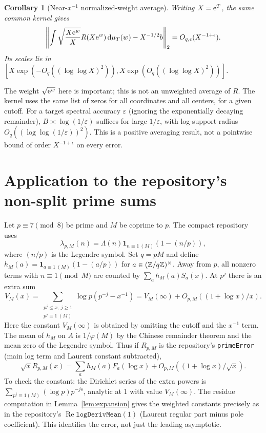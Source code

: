 \documentclass[11pt]{article}
\newtheorem{corollary}[theorem]{Corollary}
\theoremstyle{remark}\newtheorem{remark}[theorem]{Remark}
\begin{document}
\begin{corollary}[Near-$x^{-1}$ normalized-weight average]
Writing $X=\mathrm e^T$, the same common kernel gives
\[
 \left\|\int \sqrt{\frac{X\mathrm e^w}{X}}R(X\mathrm e^w)\,\mathrm d\mu_T(w)-X^{-1/2}b\right\|_2
 =O_{q,\epsilon}(X^{-1+\epsilon}).
\]
Its scales lie in $[X\exp(-O_q((\log\log X)^2)),X\exp(O_q((\log\log X)^2))]$.
\end{corollary}
The weight $\sqrt{\mathrm e^w}$ here is important; this is not an unweighted average of $R$. The kernel uses the same list of zeros for all coordinates and all centers, for a given cutoff. For a target spectral accuracy $\varepsilon$ (ignoring the exponentially decaying remainder), $B\asymp\log(1/\varepsilon)$ suffices for large $1/\varepsilon$, with log-support radius $O_q((\log\log(1/\varepsilon))^2)$. This is a positive averaging result, not a pointwise bound of order $X^{-1+\epsilon}$ on every error.

\section{Application to the repository's non-split prime sums}
Let $p\equiv7\pmod8$ be prime and $M$ be coprime to $p$. The compact repository uses
\[
 \lambda_{p,M}(n)=\Lambda(n)\mathbf1_{n\equiv1\ (M)}(1-(n/p)),
\]
where $(n/p)$ is the Legendre symbol. Set $q=pM$ and define $h_M(a)=\mathbf1_{a\equiv1\ (M)}(1-(a/p))$ for $a\in(\mathbb Z/q\mathbb Z)^\times$. Away from $p$, all nonzero terms with $n\equiv1\pmod M$ are counted by $\sum_a h_M(a) S_a(x)$. At $p^j$ there is an extra sum
\[
 V_M(x)=\sum_{\substack{p^j\le x,\ j\ge1\\p^j\equiv1\ (M)}}\log p\left(p^{-j}-x^{-1}\right)
       =V_M(\infty)+O_{p,M}((1+\log x)/x).
\]
Here the constant $V_M(\infty)$ is obtained by omitting the cutoff and the $x^{-1}$ term. The mean of $h_M$ on $A$ is $1/\varphi(M)$ by the Chinese remainder theorem and the mean zero of the Legendre symbol. Thus if $R_{p,M}$ is the repository's \texttt{primeError} (main log term and Laurent constant subtracted),
\begin{equation}\label{eq:transfer}
 \sqrt x R_{p,M}(x)=\sum_a h_M(a)F_a(\log x)+O_{p,M}((1+\log x)/\sqrt x).
\end{equation}
To check the constant: the Dirichlet series of the extra powers is $\sum_{p^j\equiv1(M)}(\log p)p^{-js}$, analytic at 1 with value $V_M(\infty)$. The residue computation in Lemma~\ref{lem:expansion} gives the weighted constants precisely as in the repository's $\operatorname{Re}\texttt{logDerivMean}(1)$ (Laurent regular part minus pole coefficient). This identifies the error, not just the leading asymptotic.
\end{document}
